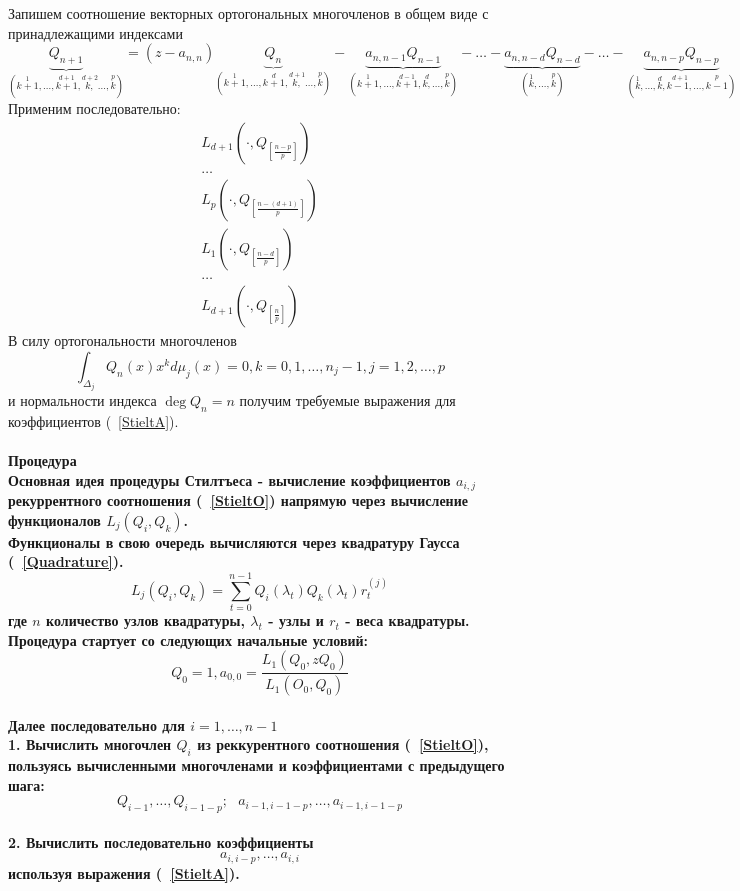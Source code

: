 Запишем соотношение векторных ортогональных многочленов в общем виде с принадлежащими индексами 
$$\underbrace{Q_{n+1}}_{(\stackrel{1}{k+1},\ldots,\stackrel{d+1}{k+1},\stackrel{d+2}{k,}\ldots,\stackrel{p}{k})}=
(z - a_{n,n})\underbrace{Q_n}_{(\stackrel{1}{k+1},\ldots,\stackrel{d}{k+1},\stackrel{d+1}{k,}\ldots,\stackrel{p}{k})} - 
\underbrace{a_{n,n-1}Q_{n-1}}_{(\stackrel{1}{k+1},\ldots,\stackrel{d-1}{k+1},\stackrel{d}{k,}\ldots,\stackrel{p}{k})}-\ldots-
\underbrace{a_{n,n-d}Q_{n-d}}_{(\stackrel{1}{k},\ldots,\stackrel{p}{k})}-\ldots-
\underbrace{a_{n,n-p}Q_{n-p}}_{(\stackrel{1}{k},\ldots,\stackrel{d}{k},\stackrel{d+1}{k-1,}\ldots,\stackrel{p}{k-1})}$$ 
Применим последовательно:
\begin{equation}
\begin{array} {cccccccccccccc}
L_{d+1} (\cdot, Q_{\left[\frac{n-p}{p}\right]}) \\
\ldots \\
L_p(\cdot, Q_{\left[\frac{n-(d+1)}{p}\right]}) \\
L_1(\cdot, Q_{\left[\frac{n-d}{p}\right]}) \\
\ldots \\
L_{d+1} (\cdot, Q_{\left[\frac{n}{p}\right]})
\end{array}
\end{equation}
В силу ортогональности многочленов 
\begin{equation}
\label{OrthogonalCondition}
\int_{\Delta_j}{Q_n(x)x^kd\mu_j(x)}=0,\mbox{
}k=0,1,\ldots,n_j-1,j=1,2,\ldots,p
\end{equation}
и нормальности индекса $\deg  Q_n=n$ получим требуемые выражения для коэффициентов (~\ref{StieltA}). \\ \\
\bf Процедура \rm \\
Основная идея процедуры Стилтъеса - вычисление коэффициентов $a_{i,j}$ рекуррентного соотношения (~\ref{StieltO}) напрямую через вычисление функционалов $L_j(Q_i,Q_k)$. \\
Функционалы в свою очередь вычисляются через квадратуру Гаусса (~\ref{Quadrature}).
\begin{equation}
L_j(Q_i,Q_k)=\sum\limits_{t=0}^{n-1}{Q_i(\lambda_{t})Q_k(\lambda_{t})r_{t}^{(j)}}
\end{equation}
где $n$ количество узлов квадратуры, $\lambda_t$ - узлы и $r_{t}$
- веса квадратуры.\\
Процедура стартует со следующих начальные условий:
$$Q_0=1, a_{0,0}=\frac{\displaystyle{L_1(Q_0,zQ_0)}}{\displaystyle{L_1(O_0,Q_0)}}$$ \\
Далее последовательно для $i=1,\ldots,n-1$ \\
1. Вычислить многочлен $Q_i$ из реккурентного соотношения (~\ref{StieltO}), пользуясь вычисленными многочленами и коэффициентами с предыдущего шага: 
$$Q_{i-1}, \ldots, Q_{i-1-p}; \mbox{    } a_{i-1,i-1-p}, \ldots,a_{i-1, i-1-p}$$  \\ 
2. Вычислить поcледовательно коэффициенты 
$$a_{i,i-p}, \ldots, a_{i,i}$$ используя выражения (~\ref{StieltA}).


